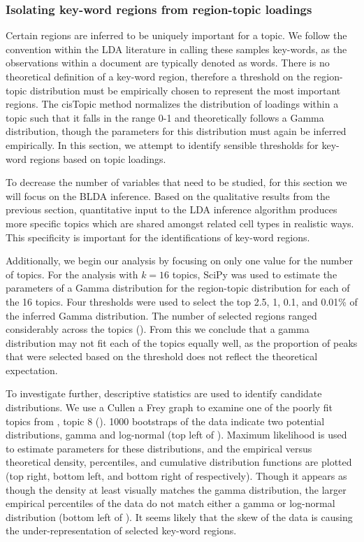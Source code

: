 \subsubsection{Isolating key-word regions from region-topic loadings}

Certain regions are inferred to be uniquely important for a topic. We follow the convention within the LDA literature in calling these samples key-words, as the observations within a document are typically denoted as words. There is no theoretical definition of a key-word region, therefore a threshold on the region-topic distribution must be empirically chosen to represent the most important regions. The cisTopic method normalizes the distribution of loadings within a topic such that it falls in the range 0-1 and theoretically follows a Gamma distribution, though the parameters for this distribution must again be inferred empirically. In this section, we attempt to identify sensible thresholds for key-word regions based on topic loadings. 

To decrease the number of variables that need to be studied, for this section we will focus on the BLDA inference. Based on the qualitative results from the previous section, quantitative input to the LDA inference algorithm produces more specific topics which are shared amongst related cell types in realistic ways. This specificity is important for the identifications of key-word regions. 

Additionally, we begin our analysis by focusing on only one value for the number of topics. For the analysis with $k = 16$ topics, SciPy was used to estimate the parameters of a Gamma distribution for the region-topic distribution for each of the 16 topics. Four thresholds were used to select the top 2.5, 1, 0.1, and 0.01\% of the inferred Gamma distribution. The number of selected regions ranged considerably across the topics (). From this we conclude that a gamma distribution may not fit each of the topics equally well, as the proportion of peaks that were selected based on the threshold does not reflect the theoretical expectation. 

To investigate further, descriptive statistics are used to identify candidate distributions. We use a Cullen a Frey graph to examine one of the poorly fit topics from , topic 8 (). 1000 bootstraps of the data indicate two potential distributions, gamma and log-normal (top left of ). Maximum likelihood is used to estimate parameters for these distributions, and the empirical versus theoretical density, percentiles, and cumulative distribution functions are plotted (top right, bottom left, and bottom right of  respectively).  Though it appears as though the density at least visually matches the gamma distribution, the larger empirical percentiles of the data do not match either a gamma or log-normal distribution (bottom left of ). It seems likely that the skew of the data is causing the under-representation of selected key-word regions. 


